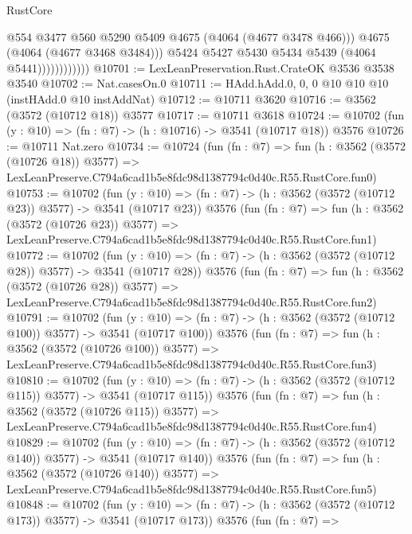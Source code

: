 \begin{lexlean}{RustCore}
\begin{coremodule}
                              @554
                              @3477
                              @560
                              @5290
                              @5409
                              @4675
                              (@4064 (@4677 @3478 @466)))
                            @4675
                            (@4064 (@4677 @3468 @3484)))
                          @5424
                          @5427
                          @5430
                          @5434
                          @5439
                          (@4064 @5441))))))))))))
@10701 := LexLeanPreservation.Rust.CrateOK @3536 @3538 @3540
@10702 := Nat.casesOn.{0}
@10711 := HAdd.hAdd.{0, 0, 0} @10 @10 @10 (instHAdd.{0} @10 instAddNat)
@10712 := @10711 @3620
@10716 := @3562 (@3572 (@10712 @18)) @3577
@10717 := @10711 @3618
@10724 := @10702 (fun (y : @10) => (fn : @7) -> (h : @10716) -> @3541 (@10717 @18)) @3576
@10726 := @10711 Nat.zero
@10734 := @10724
    (fun (fn : @7) =>
    fun (h : @3562 (@3572 (@10726 @18)) @3577) =>
    LexLeanPreserve.C794a6cad1b5e8fdc98d1387794c0d40c.R55.RustCore.fun0)
@10753 := @10702
    (fun (y : @10) => (fn : @7) -> (h : @3562 (@3572 (@10712 @23)) @3577) -> @3541 (@10717 @23))
    @3576
    (fun (fn : @7) =>
    fun (h : @3562 (@3572 (@10726 @23)) @3577) =>
    LexLeanPreserve.C794a6cad1b5e8fdc98d1387794c0d40c.R55.RustCore.fun1)
@10772 := @10702
    (fun (y : @10) => (fn : @7) -> (h : @3562 (@3572 (@10712 @28)) @3577) -> @3541 (@10717 @28))
    @3576
    (fun (fn : @7) =>
    fun (h : @3562 (@3572 (@10726 @28)) @3577) =>
    LexLeanPreserve.C794a6cad1b5e8fdc98d1387794c0d40c.R55.RustCore.fun2)
@10791 := @10702
    (fun (y : @10) => (fn : @7) -> (h : @3562 (@3572 (@10712 @100)) @3577) -> @3541 (@10717 @100))
    @3576
    (fun (fn : @7) =>
    fun (h : @3562 (@3572 (@10726 @100)) @3577) =>
    LexLeanPreserve.C794a6cad1b5e8fdc98d1387794c0d40c.R55.RustCore.fun3)
@10810 := @10702
    (fun (y : @10) => (fn : @7) -> (h : @3562 (@3572 (@10712 @115)) @3577) -> @3541 (@10717 @115))
    @3576
    (fun (fn : @7) =>
    fun (h : @3562 (@3572 (@10726 @115)) @3577) =>
    LexLeanPreserve.C794a6cad1b5e8fdc98d1387794c0d40c.R55.RustCore.fun4)
@10829 := @10702
    (fun (y : @10) => (fn : @7) -> (h : @3562 (@3572 (@10712 @140)) @3577) -> @3541 (@10717 @140))
    @3576
    (fun (fn : @7) =>
    fun (h : @3562 (@3572 (@10726 @140)) @3577) =>
    LexLeanPreserve.C794a6cad1b5e8fdc98d1387794c0d40c.R55.RustCore.fun5)
@10848 := @10702
    (fun (y : @10) => (fn : @7) -> (h : @3562 (@3572 (@10712 @173)) @3577) -> @3541 (@10717 @173))
    @3576
    (fun (fn : @7) =>

\end{coremodule}
\end{lexlean}
